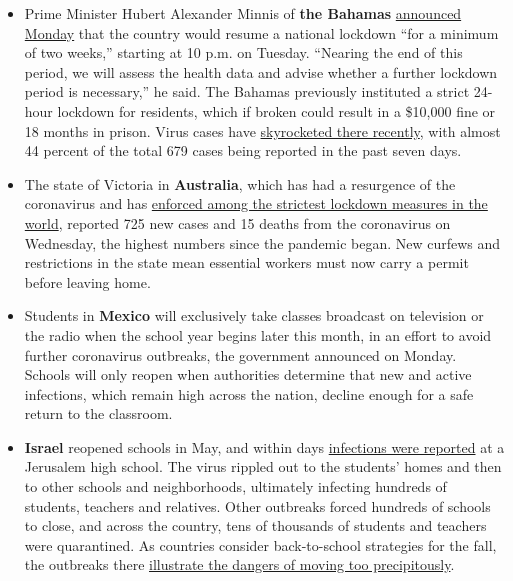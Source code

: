 \begin{itemize}
\item
  Prime Minister Hubert Alexander Minnis of \textbf{the Bahamas}
  \href{https://www.youtube.com/watch?v=ZzwLiboOXe0}{announced Monday}
  that the country would resume a national lockdown ``for a minimum of
  two weeks,'' starting at 10 p.m. on Tuesday. ``Nearing the end of this
  period, we will assess the health data and advise whether a further
  lockdown period is necessary,'' he said. The Bahamas previously
  instituted a strict 24-hour lockdown for residents, which if broken
  could result in a \$10,000 fine or 18 months in prison. Virus cases
  have
  \href{https://www.nytimes.com/interactive/2020/world/coronavirus-maps.html}{skyrocketed
  there recently}, with almost 44 percent of the total 679 cases being
  reported in the past seven days.
\item
  The state of Victoria in \textbf{Australia}, which has had a
  resurgence of the coronavirus and has
  \href{https://www.nytimes.com/2020/08/04/world/australia/coronavirus-melbourne-lockdown.html}{enforced
  among the strictest lockdown measures in the world}, reported 725 new
  cases and 15 deaths from the coronavirus on Wednesday, the highest
  numbers since the pandemic began. New curfews and restrictions in the
  state mean essential workers must now carry a permit before leaving
  home.
\item
  Students in \textbf{Mexico} will exclusively take classes broadcast on
  television or the radio when the school year begins later this month,
  in an effort to avoid further coronavirus outbreaks, the government
  announced on Monday. Schools will only reopen when authorities
  determine that new and active infections, which remain high across the
  nation, decline enough for a safe return to the classroom.
\item
  \textbf{Israel} reopened schools in May, and within days
  \href{https://www.nytimes.com/2020/08/04/world/middleeast/coronavirus-israel-schools-reopen.html}{infections
  were reported} at a Jerusalem high school. The virus rippled out to
  the students' homes and then to other schools and neighborhoods,
  ultimately infecting hundreds of students, teachers and relatives.
  Other outbreaks forced hundreds of schools to close, and across the
  country, tens of thousands of students and teachers were quarantined.
  As countries consider back-to-school strategies for the fall, the
  outbreaks there
  \href{https://www.nytimes.com/2020/08/04/world/middleeast/coronavirus-israel-schools-reopen.html}{illustrate
  the dangers of moving too precipitously}.
\end{itemize}

